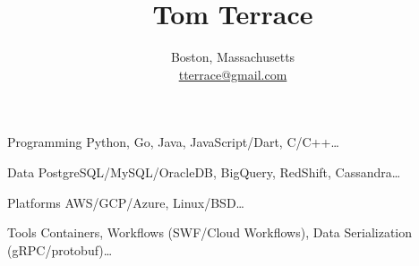 \documentclass[10pt]{article}   	%
\title{\bfseries\Huge Tom Terrace\vspace{-0.3cm}}
\author{
	Boston, Massachusetts\\
	\href{mailto:tterrace@gmail.com}{tterrace@gmail.com}\vspace{-0.5cm}
}
\date{}							%
\begin{document}
\maketitle
\thispagestyle{empty}
\pagestyle{empty}

\begin{description*}
	\item[Programming] Python, Go, Java, JavaScript/Dart, C/C++\ldots
	\item[Data] PostgreSQL/MySQL/OracleDB, BigQuery, RedShift, Cassandra\ldots
	\item[Platforms] AWS/GCP/Azure, Linux/BSD\ldots
	\item[Tools] Containers, Workflows (SWF/Cloud Workflows), Data Serialization (gRPC/protobuf)\ldots
\end{description*}
\end{document}
